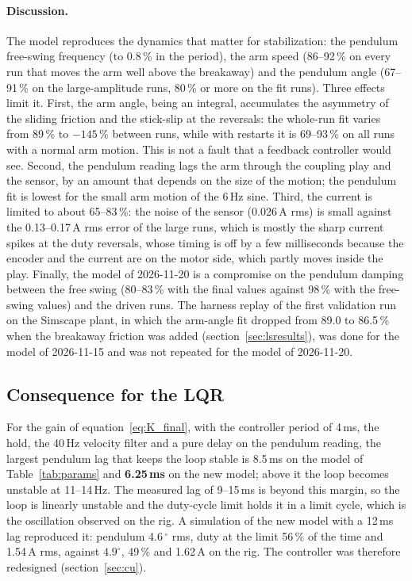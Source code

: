 \documentclass[a4paper,11pt]{article}
\begin{document}
\paragraph{Discussion.} The model reproduces the dynamics that matter for stabilization: the pendulum free-swing frequency (to 0.8\,\% in the period), the arm speed (86--92\,\% on every run that moves the arm well above the breakaway) and the pendulum angle (67--91\,\% on the large-amplitude runs, 80\,\% or more on the fit runs). Three effects limit it. First, the arm angle, being an integral, accumulates the asymmetry of the sliding friction and the stick-slip at the reversals: the whole-run fit varies from 89\,\% to $-145$\,\% between runs, while with restarts it is 69--93\,\% on all runs with a normal arm motion. This is not a fault that a feedback controller would see. Second, the pendulum reading lags the arm through the coupling play and the sensor, by an amount that depends on the size of the motion; the pendulum fit is lowest for the small arm motion of the 6\,Hz sine. Third, the current is limited to about 65--83\,\%: the noise of the sensor (0.026\,A rms) is small against the 0.13--0.17\,A rms error of the large runs, which is mostly the sharp current spikes at the duty reversals, whose timing is off by a few milliseconds because the encoder and the current are on the motor side, which partly moves inside the play. Finally, the model of 2026-11-20 is a compromise on the pendulum damping between the free swing (80--83\,\% with the final values against 98\,\% with the free-swing values) and the driven runs. The harness replay of the first validation run on the Simscape plant, in which the arm-angle fit dropped from 89.0 to 86.5\,\% when the breakaway friction was added (section~\ref{sec:lsresults}), was done for the model of 2026-11-15 and was not repeated for the model of 2026-11-20.

\subsection{Consequence for the LQR}
\label{sec:reid_lqr}
For the gain of equation~\ref{eq:K_final}, with the controller period of 4\,ms, the hold, the 40\,Hz velocity filter and a pure delay on the pendulum reading, the largest pendulum lag that keeps the loop stable is 8.5\,ms on the model of Table~\ref{tab:params} and \textbf{6.25\,ms} on the new model; above it the loop becomes unstable at 11--14\,Hz. The measured lag of 9--15\,ms is beyond this margin, so the loop is linearly unstable and the duty-cycle limit holds it in a limit cycle, which is the oscillation observed on the rig. A simulation of the new model with a 12\,ms lag reproduced it: pendulum 4.6\,$^\circ$ rms, duty at the limit 56\,\% of the time and 1.54\,A rms, against $4.9^\circ$, 49\,\% and 1.62\,A on the rig. The controller was therefore redesigned (section~\ref{sec:cu}).
\end{document}

